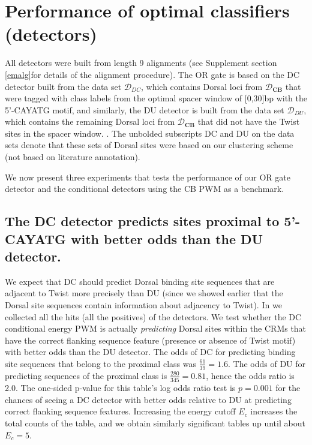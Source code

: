 \section{Performance of optimal classifiers (detectors) }

All detectors were built from length 9 alignments (see Supplement section \ref{emalg}for details of the alignment procedure).
The OR gate is based on the DC detector built from the data set $\mathcal D_{DC}$, which contains Dorsal loci from  $\mathcal D_{\textbf{CB}}$ that were tagged with class labels from the optimal spacer window of [0,30]bp with the 5'-CAYATG motif, and similarly, the DU detector is built from the data set $\mathcal D_{DU}$, which contains the remaining Dorsal loci from  $\mathcal D_{\textbf{CB}}$ that did not have the Twist sites in the spacer window.  .  
The unbolded subscripts DC and DU on the data sets denote that these sets of Dorsal sites were based on our clustering scheme (not based on literature annotation). 

We now present three experiments that tests the performance of our OR gate detector and the conditional detectors using the CB PWM as a benchmark.

\subsection{The DC detector predicts sites proximal to 5'-CAYATG with better odds than the DU detector.}
We expect that DC should predict Dorsal binding site sequences that are adjacent to Twist more precisely than DU (since we showed earlier that the Dorsal site sequences contain information about adjacency to Twist).  In  we collected all the hits (all the positives) of the detectors.  We test whether the DC conditional energy PWM is actually \textit{predicting} Dorsal sites within the CRMs that have the correct flanking sequence feature (presence or absence of Twist motif) with better odds than the DU detector.
The odds of DC for predicting binding site sequences that belong to the proximal class was $\frac{61}{39}=1.6$.  The odds of DU for predicting sequences of the proximal class is $\frac{280}{345}=0.81$, hence the odds ratio is 2.0.  The one-sided p-value for this table's log odds ratio test is $p=0.001$ for the chances of seeing a DC detector with better odds relative to DU at predicting correct flanking sequence features.  Increasing the energy cutoff $E_c$ increases the total counts of the table, and we obtain similarly significant tables up until about $E_c=5$.

